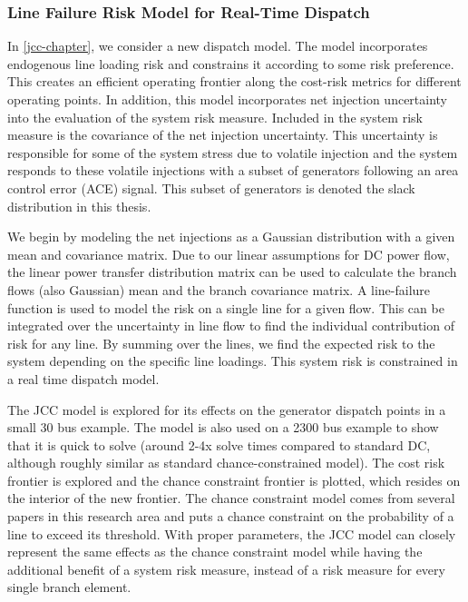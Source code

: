 \subsubsection{Line Failure Risk Model for Real-Time Dispatch}
In \cref{jcc-chapter}, we consider a new dispatch model.  The model incorporates endogenous line loading risk and constrains it according to some risk preference.  This creates an efficient operating frontier along the cost-risk metrics for different operating points.  In addition, this model incorporates net injection uncertainty into the evaluation of the system risk measure.  Included in the system risk measure is the covariance of the net injection uncertainty.  This uncertainty is responsible for some of the system stress due to volatile injection and the system responds to these volatile injections with a subset of generators following an area control error (ACE) signal.  This subset of generators is denoted the slack distribution in this thesis.

We begin by modeling the net injections as a Gaussian distribution with a given mean and covariance matrix.  Due to our linear assumptions for DC power flow, the linear power transfer distribution matrix can be used to calculate the branch flows (also Gaussian) mean and the branch covariance matrix.  A line-failure function is used to model the risk on a single line for a given flow.  This can be integrated over the uncertainty in line flow to find the individual contribution of risk for any line.  By summing over the lines, we find the expected risk to the system depending on the specific line loadings.  This system risk is constrained in a real time dispatch model.

The JCC model is explored for its effects on the generator dispatch points in a small 30 bus example. The model is also used on a 2300 bus example to show that it is quick to solve (around 2-4x solve times compared to standard DC, although roughly similar as standard chance-constrained model).  The cost risk frontier is explored and the chance constraint frontier is plotted, which resides on the interior of the new frontier.  The chance constraint model comes from several papers in this research area and puts a chance constraint on the probability of a line to exceed its threshold.  With proper parameters, the JCC model can closely represent the same effects as the chance constraint model while having the additional benefit of a system risk measure, instead of a risk measure for every single branch element.

